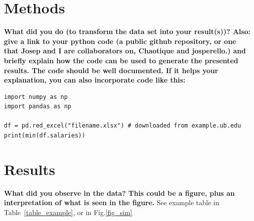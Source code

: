 \documentclass[
  journal=small,
  manuscript=mini-article,  %
  year=2023,
  volume=1,
]{odj-journal}
\begin{document}
\section{Methods}
\textbf{What did you do (to transform the data set into your result(s))? Also: give a link to your python code (a public github repository, or one that Josep and I are collaborators on, Chaotique and josperello.) and briefly explain how the code can be used to generate the presented results. The code should be well documented. If it helps your explanation, you can also incorporate code like this:}
\begin{lstlisting}
import numpy as np 
import pandas as np

df = pd.red_excel("filename.xlsx") # downloaded from example.ub.edu
print(min(df.salaries))
\end{lstlisting}
\lipsum[1]



\section{Results}
\textbf{What did you observe in the data? This could be a figure, plus an interpretation of what is seen in the figure.} See example table in Table~\ref{table_example}, or in Fig.\ref{fig_sim}\lipsum[1]
\end{document}
